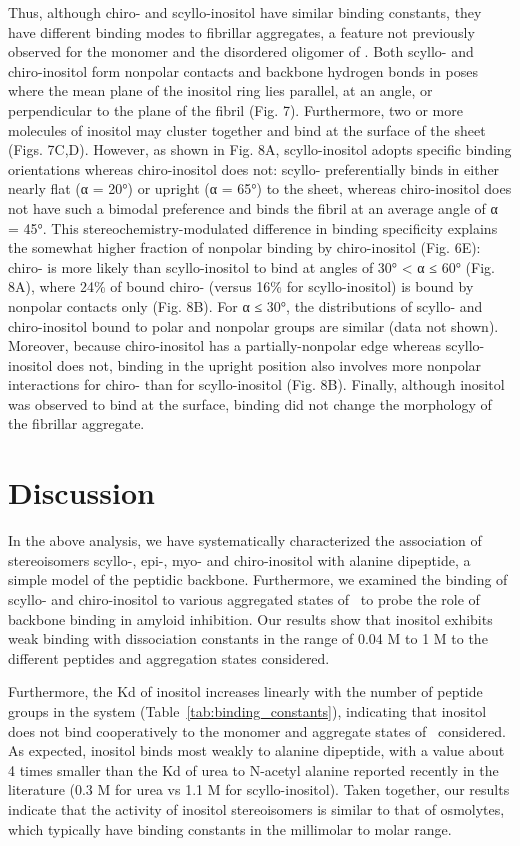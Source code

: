 Thus, although chiro- and scyllo-inositol have similar binding constants, they have different binding modes to fibrillar aggregates, a feature not previously observed for the monomer and the disordered oligomer of \gafour. Both scyllo- and chiro-inositol form nonpolar contacts and backbone hydrogen bonds in poses where the mean plane of the inositol ring lies parallel, at an angle, or perpendicular to the plane of the fibril (Fig. 7). Furthermore, two or more molecules of inositol may cluster together and bind at the surface of the sheet (Figs. 7C,D). However, as shown in Fig. 8A, scyllo-inositol adopts specific binding orientations whereas chiro-inositol does not: scyllo- preferentially binds in either nearly flat (α = 20°) or upright (α = 65°) to the sheet, whereas chiro-inositol does not have such a bimodal preference and binds the fibril at an average angle of α = 45°. This stereochemistry-modulated difference in binding specificity explains the somewhat higher fraction of nonpolar binding by chiro-inositol (Fig. 6E): chiro- is more likely than scyllo-inositol to bind at angles of 30° < α ≤ 60° (Fig. 8A), where 24\% of bound chiro- (versus 16\% for scyllo-inositol) is bound by nonpolar contacts only (Fig. 8B). For α ≤ 30°, the distributions of scyllo- and chiro-inositol bound to polar and nonpolar groups are similar (data not shown). Moreover, because chiro-inositol has a partially-nonpolar edge whereas scyllo-inositol does not, binding in the upright position also involves more nonpolar interactions for chiro- than for scyllo-inositol (Fig. 8B). Finally, although inositol was observed to bind at the surface, binding did not change the morphology of the fibrillar aggregate.


\section{Discussion}
In the above analysis, we have systematically characterized the association of stereoisomers scyllo-, epi-, myo- and chiro-inositol with alanine dipeptide, a simple model of the peptidic backbone. Furthermore, we examined the binding of scyllo- and chiro-inositol to various aggregated states of \gafour\ to probe the role of backbone binding in amyloid inhibition. Our results show that inositol exhibits weak binding with dissociation constants in the range of 0.04 M to 1 M to the different peptides and aggregation states considered.

Furthermore, the Kd of inositol increases linearly with the number of peptide groups in the system (Table~\ref{tab:binding_constants}), indicating that inositol does not bind cooperatively to the monomer and aggregate states of \gafour\ considered. As expected, inositol binds most weakly to alanine dipeptide, with a value about 4 times smaller than the Kd of urea to N-acetyl alanine reported recently in the literature (0.3 M for urea\cite{Lee:2010p59} vs 1.1 M for scyllo-inositol). Taken together, our results indicate that the activity of inositol stereoisomers is similar to that of osmolytes, which typically have binding constants in the millimolar to molar range.\cite{Rosgen:2007p90,Street:2006p21}

